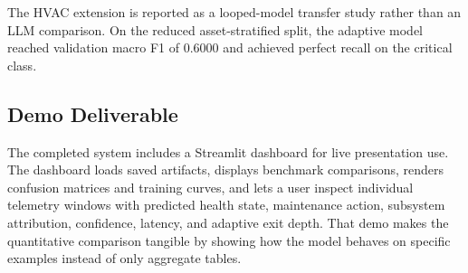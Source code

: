 The HVAC extension is reported as a looped-model transfer study rather than an LLM comparison. On the reduced asset-stratified split, the adaptive model reached validation macro F1 of 0.6000 and achieved perfect recall on the critical class.

\begin{table}[t]
\centering
\small
\caption{Cross-domain extension results}
\label{tab:extension-results}
\end{table}

\subsection{Demo Deliverable}
The completed system includes a Streamlit dashboard for live presentation use. The dashboard loads saved artifacts, displays benchmark comparisons, renders confusion matrices and training curves, and lets a user inspect individual telemetry windows with predicted health state, maintenance action, subsystem attribution, confidence, latency, and adaptive exit depth. That demo makes the quantitative comparison tangible by showing how the model behaves on specific examples instead of only aggregate tables.
